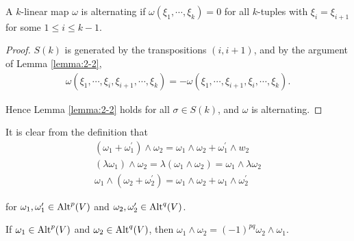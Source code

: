 \begin{lemma}\label{lemma:2-7}
  A $k$-linear map $\omega$ is alternating if $\omega(\xi_1, \cdots, \xi_k) = 0$ for all $k$-tuples
  with $\xi_i = \xi_{i+1}$ for some $1\le i\le k-1$.
\end{lemma}


\begin{proof}
  $S(k)$ is generated by the transpositions $(i, i + 1)$, and by the argument
  of Lemma \ref{lemma:2-2},
  \begin{align*}
    \omega(\xi_1, \cdots, \xi_i, \xi_{i+1}, \cdots, \xi_k)
    = - \omega(\xi_1, \cdots, \xi_{i+1}, \xi_i, \cdots, \xi_k).
  \end{align*}

  Hence Lemma \ref{lemma:2-2} holds for all $\sigma\in S(k)$, and $\omega$ is alternating.
\end{proof}

It is clear from the definition that
\begin{align*}
  (\omega_{1}+\omega_{1}^{\prime})\wedge\omega_{2}
  = \omega_{1}\wedge\omega_{2}+\omega_{1}^{\prime}\wedge w_{2}            \\
  (\lambda\omega_{1})\wedge\omega_{2}
  = \lambda(\omega_{1}\wedge\omega_{2})=\omega_{1}\wedge\lambda\omega_{2} \\
  \omega_{1}\wedge\left(\omega_{2}+\omega_{2}^{\prime}\right)
  = \omega_{1}\wedge\omega_{2}+\omega_{1}\wedge\omega_{2}^{\prime}
\end{align*}

for $\omega_1, \omega_1' \in\operatorname{Alt}^p(V)$ and $\omega_2, \omega_2'\in\operatorname{Alt}^q(V)$.


\begin{lemma}\label{lemma:2-8}
  If $\omega_1\in\operatorname{Alt}^p(V)$ and $\omega_2\in\operatorname{Alt}^q(V)$, then $\omega_1\wedge\omega_2 = (-1)^{pq}\omega_2\wedge\omega_1$.
\end{lemma}


